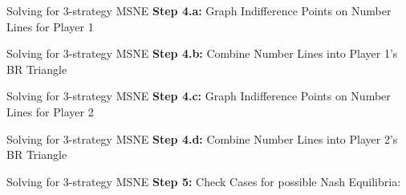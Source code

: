 
\begin{frame}{Solving for 3-strategy MSNE}
  \textbf{Step 4.a:} Graph Indifference Points on Number Lines for Player 1

  \vspace{60mm}
  
\end{frame}


\begin{frame}{Solving for 3-strategy MSNE}
  \textbf{Step 4.b:} Combine Number Lines into Player 1's BR Triangle
  \begin{center}
  \end{center}
\end{frame}


\begin{frame}{Solving for 3-strategy MSNE}
  \textbf{Step 4.c:} Graph Indifference Points on Number Lines for Player 2

  \vspace{60mm}
  
\end{frame}


\begin{frame}{Solving for 3-strategy MSNE}
  \textbf{Step 4.d:} Combine Number Lines into Player 2's BR Triangle
  \begin{center}
  \end{center}
\end{frame}


\begin{frame}{Solving for 3-strategy MSNE}
  \textbf{Step 5:} Check Cases for possible Nash Equilibria:

  \vspace{60mm}
  
\end{frame}


